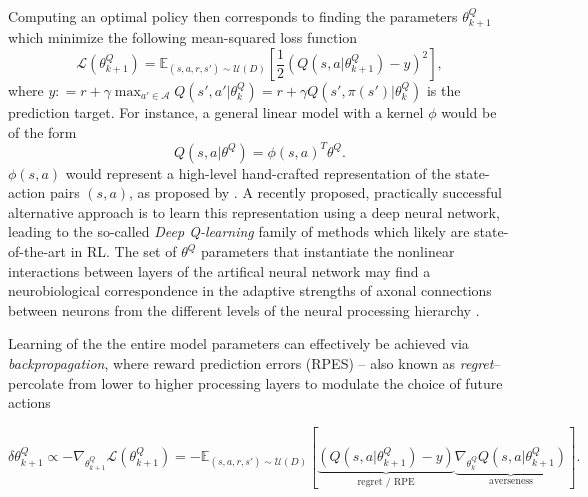 \documentclass[10pt,letterpaper]{article}
\begin{document}
Computing an optimal policy then corresponds to finding the parameters $\theta^Q_{k+1}$ which minimize the following mean-squared loss function
\begin{equation}
  \mathcal L(\theta^Q_{k+1})
  = \mathbb E_{(s, a, r, s') \sim \mathcal U(D)}\left[\frac{1}{2}(Q(s, a|\theta^Q_{k+1}) - y)^2\right],
  \label{eq:oracle}
\end{equation}
where
$ y: = r + \gamma \max_{a' \in \mathcal A} Q(s', a'|\theta^Q_k) = r + \gamma Q(s', \pi(s')|\theta^Q_k)$ is the prediction target.
For instance, a general linear model with a kernel $\phi$ would be of the
form
$${Q}(s, a|\theta^Q) = \phi(s,a)^T\theta^Q.$$
$\phi(s,a)$ would represent a high-level hand-crafted representation of the state-action pairs
$(s,a)$, as proposed by \citep{songNIPS2016}.
A recently proposed, practically successful alternative approach
\citep{mnih2015,silver2016mastering} is to learn this
representation using a deep neural network, leading to the so-called \textit{Deep Q-learning} family of methods which
likely are state-of-the-art in RL.
The set of $\theta^Q$ parameters that instantiate the nonlinear interactions
between layers of the artifical neural network
may find a neurobiological correspondence in the adaptive strengths of axonal
connections between neurons from the different levels
of the neural processing hierarchy
\citep{mesulam1998sensation, taylor2015global}.



Learning
of the the entire model parameters can effectively be achieved
via \textit{backpropagation},
where reward prediction errors (RPES) -- also known as \textit{regret}-- percolate from lower to higher processing layers to modulate the choice of future actions

\begin{equation}
  \delta \theta_{k+1}^Q \propto -\nabla_{\theta^Q_{k+1}}\mathcal L(\theta^Q_{k+1})
  = -\mathbb E_{(s, a, r, s') \sim \mathcal U(D)}\left[\underbrace{(Q(s, a|\theta^Q_{k+1}) - y)}_{\text{regret / RPE}}
    \underbrace{\nabla_{\theta^Q_{k}}Q(s, a|\theta^Q_{k+1})}_{\text{averseness}}\right].
  \label{eq:oracle}
\end{equation}
\end{document}
